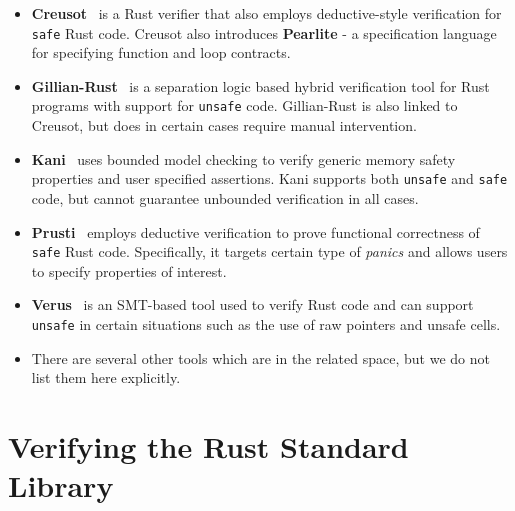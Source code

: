 \documentclass[runningheads]{llncs}
\begin{document}
\begin{itemize}

    \item \textbf{Creusot}~\cite{denis2022creusot} is a Rust verifier that also employs deductive-style verification for \texttt{safe} Rust code. Creusot also introduces \textbf{Pearlite} - a specification language for specifying function and loop contracts. 

    \item \textbf{Gillian-Rust}~\cite{ayoun2024hybrid} is a separation logic based hybrid verification tool for Rust programs with support for \texttt{unsafe} code. Gillian-Rust is also linked to Creusot, but does in certain cases require manual intervention. 

    \item \textbf{Kani}~\cite{vanhattum2022verifying} uses bounded model checking to verify generic memory safety properties and user specified assertions. Kani supports both \texttt{unsafe} and \texttt{safe} code, but cannot guarantee unbounded verification in all cases. 
 
    \item \textbf{Prusti}~\cite{astrauskas2022prusti} employs deductive verification to prove functional correctness of \texttt{safe} Rust code. Specifically, it targets certain type of \textit{panics} and allows users to specify properties of interest. 

    \item \textbf{Verus}~\cite{verus-sys} is an SMT-based tool used to verify Rust code and can support \texttt{unsafe} in certain situations such as the use of raw pointers and unsafe cells. 

    \item There are several other tools which are in the related space, but we do not list them here explicitly.
\end{itemize}

\section{Verifying the Rust Standard Library}
\end{document}
